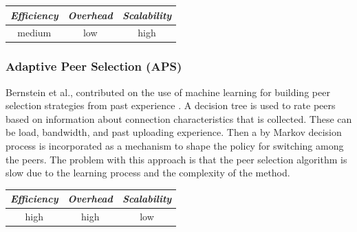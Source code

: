 %
%

\begin{center}
\begin{tabular}{ccc}
\emph{Efficiency} & \emph{Overhead} & \emph{Scalability} \\
\hline
medium &
low &
high
\end{tabular}
\end{center}

\subsubsection{Adaptive Peer Selection (APS)}
Bernstein et al., contributed on the use of machine learning for building peer
selection strategies from past experience \cite{bflz_adaptpeersel_2003}. A
decision tree is used to rate peers based on information about connection
characteristics that is collected. These can be load, bandwidth, and past
uploading experience. Then a by Markov decision process is incorporated as a
mechanism to shape the policy for switching among the peers. The problem
with this approach is that the peer selection algorithm is slow due to the
learning process and the complexity of the method.

\begin{center}
\begin{tabular}{ccc}
\emph{Efficiency} & \emph{Overhead} & \emph{Scalability} \\
\hline
high &
high &
%
low
\end{tabular}
\end{center}

